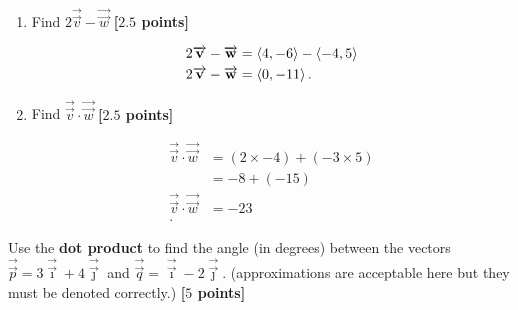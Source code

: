 \begin{solution}
  \begin{enumerate}
    \item Find $2 \overrightarrow{\vec{v}} - \overrightarrow{\vec{w}}$
      \textbf{[$2.5$ points]}

      \begin{align*}
        2 \overrightarrow{\mathbf{v}} - \overrightarrow{\mathbf{w}} &= \braket{4,-6} - \braket{-4,5} \\
        2 \overrightarrow{\mathbf{v}} - \overrightarrow{\mathbf{w}} &= \braket{0,-11}
      .\end{align*}

    \item Find $\overrightarrow{\vec{v}} \cdot \overrightarrow{\vec{w}}$
      \textbf{[$2.5$ points]}

      \begin{align*}
        \overrightarrow{\vec{v}} \cdot \overrightarrow{\vec{w}} &= (2 \times -4) + (-3 \times 5) \\
                                                                &= -8 + (-15) \\
        \overrightarrow{\vec{v}} \cdot \overrightarrow{\vec{w}} &= -23 \\
      .\end{align*}
  \end{enumerate}
\end{solution}

\newpage

\begin{problem}
  Use the \textbf{dot product} to find the angle (in degrees) between the
  vectors $\overrightarrow{\vec{p}} = 3\overrightarrow{\vec{\imath}} +
  4\overrightarrow{\vec{\jmath}}$ and $\overrightarrow{\vec{q}} =
  \overrightarrow{\vec{\imath}} - 2\overrightarrow{\vec{\jmath}}$.
  (approximations are acceptable here but they must be denoted correctly.)
  \textbf{[$5$ points]}
\end{problem}

